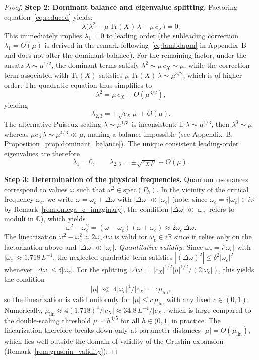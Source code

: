 \documentclass[12pt,a4paper]{amsart}
\theoremstyle{remark}
\begin{document}
\begin{proof}
\textbf{Step 2: Dominant balance and eigenvalue splitting.}
Factoring equation~\eqref{eq:reduced} yields:
\[
  \lambda\bigl(\lambda^2 - \mu\,\mathrm{Tr}(X)\,\lambda - \mu\,c_X\bigr) = 0.
\]
This immediately implies $\lambda_1 = 0$ to leading order (the subleading correction $\lambda_1 = O(\mu)$ is derived in the remark following~\eqref{eq:lambdapm} in Appendix~B and does not alter the dominant balance).
For the remaining factor, under the ansatz $\lambda \sim \mu^{1/2}$,
the dominant terms satisfy $\lambda^2 \sim \mu\,c_X \sim \mu$,
while the correction term associated with $\mathrm{Tr}(X)$ satisfies $\mu\,\mathrm{Tr}(X)\,\lambda \sim \mu^{3/2}$,
which is of higher order. The quadratic equation thus simplifies to
\[
  \lambda^2 = \mu\,c_X + O(\mu^{3/2}),
\]
yielding
\[
  \lambda_{2,3} = \pm\sqrt{c_X\,\mu} + O(\mu).
\]
The alternative Puiseux scaling $\lambda \sim \mu^{1/3}$ is inconsistent: if $\lambda \sim \mu^{1/3}$,
then $\lambda^3 \sim \mu$ whereas $\mu c_X \lambda \sim \mu^{4/3} \ll \mu$,
making a balance impossible (see Appendix~B, Proposition~\ref{prop:dominant_balance}).
The unique consistent leading-order eigenvalues are therefore
\[
  \lambda_1 = 0, \qquad \lambda_{2,3} = \pm\sqrt{c_X\,\mu} + O(\mu).
\]

\textbf{Step 3: Determination of the physical frequencies.}
Quantum resonances correspond to values $\omega$ such that $\omega^2 \in \mathrm{spec}(P_h)$.
In the vicinity of the critical frequency $\omega_c$, we write $\omega = \omega_c + \Delta\omega$
with $|\Delta\omega| \ll |\omega_c|$ (note: since $\omega_c = i|\omega_c| \in i\mathbb{R}$ by
Remark~\ref{rem:omega_c_imaginary}, the condition $|\Delta\omega| \ll |\omega_c|$ refers to
moduli in $\mathbb{C}$), which yields
\[
  \omega^2 - \omega_c^2
  = (\omega - \omega_c)(\omega + \omega_c)
  \approx 2\omega_c\,\Delta\omega.
\]
The linearization $\omega^2 - \omega_c^2 \approx 2\omega_c\Delta\omega$ is valid
for $\omega_c \in i\mathbb{R}$ since it relies only on the factorization above
and $|\Delta\omega| \ll |\omega_c|$.
\emph{Quantitative validity.}
Since $\omega_c = i|\omega_c|$ with $|\omega_c| \approx 1.718\,L^{-1}$,
the neglected quadratic term satisfies
$|(\Delta\omega)^2| \leq \delta^2|\omega_c|^2$
whenever $|\Delta\omega| \leq \delta|\omega_c|$.
For the splitting $|\Delta\omega| = |c_X|^{1/2}|\mu|^{1/2}/(2|\omega_c|)$,
this yields the condition
\[
  |\mu| \;\ll\; 4|\omega_c|^4/|c_X| =: \mu_{\mathrm{lin}},
\]
so the linearization is valid uniformly for $|\mu| \leq c\,\mu_{\mathrm{lin}}$
with any fixed $c \in (0,1)$.
Numerically, $\mu_{\mathrm{lin}} \approx 4(1.718)^4/|c_X| \approx 34.8\,L^{-4}/|c_X|$,
which is large compared to the double-scaling threshold $\mu \sim h^{4/5}$ for
all $h \in (0,1]$ in practice.
The linearization therefore breaks down only at parameter distances
$|\mu| = O(\mu_{\mathrm{lin}})$, which lies well outside the domain of validity
of the Grushin expansion (Remark~\ref{rem:grushin_validity}).


\end{proof}
\end{document}
